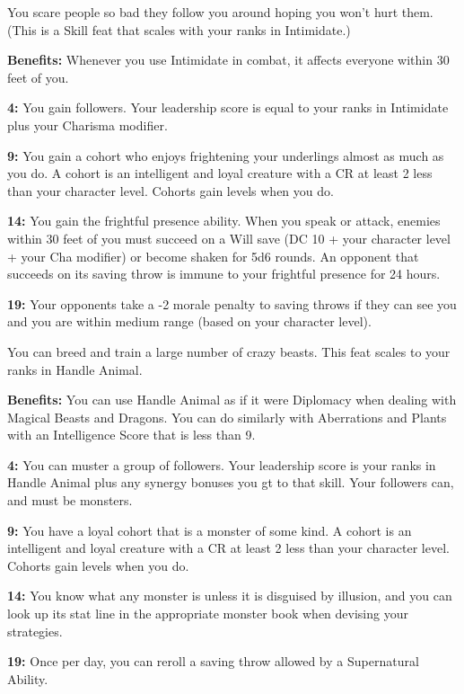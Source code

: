 
You scare people so bad they follow you around hoping you won't hurt them. (This is a Skill feat that scales with your ranks in Intimidate.)

\textbf{Benefits:} Whenever you use Intimidate in combat, it affects everyone within 30 feet of you.

\textbf{4:} You gain followers. Your leadership score is equal to your ranks in Intimidate plus your Charisma modifier.

\textbf{9:} You gain a cohort who enjoys frightening your underlings almost as much as you do. A cohort is an intelligent and loyal creature with a CR at least 2 less than your character level. Cohorts gain levels when you do.

\textbf{14:} You gain the frightful presence ability. When you speak or attack, enemies within 30 feet of you must succeed on a Will save (DC 10 + your character level + your Cha modifier) or become shaken for 5d6 rounds. An opponent that succeeds on its saving throw is immune to your frightful presence for 24 hours.

\textbf{19:} Your opponents take a -2 morale penalty to saving throws if they can see you and you are within medium range (based on your character level).


You can breed and train a large number of crazy beasts. This feat scales to your ranks in Handle Animal.

\textbf{Benefits:} You can use Handle Animal as if it were Diplomacy when dealing with Magical Beasts and Dragons. You can do similarly with Aberrations and Plants with an Intelligence Score that is less than 9.

\textbf{4:} You can muster a group of followers. Your leadership score is your ranks in Handle Animal plus any synergy bonuses you gt to that skill. Your followers can, and must be monsters.

\textbf{9:} You have a loyal cohort that is a monster of some kind. A cohort is an intelligent and loyal creature with a CR at least 2 less than your character level. Cohorts gain levels when you do.

\textbf{14:} You know what any monster is unless it is disguised by illusion, and you can look up its stat line in the appropriate monster book when devising your strategies.

\textbf{19:} Once per day, you can reroll a saving throw allowed by a Supernatural Ability.

